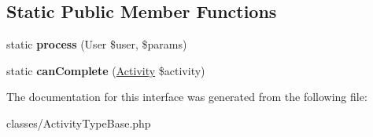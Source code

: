 \subsection*{Static Public Member Functions}
\begin{DoxyCompactItemize}
\item 
\hypertarget{interfaceDMA_1_1Friends_1_1Classes_1_1ActivityTypeBaseInterface_ab5fb9bf86960f863debe09ead7297ae7}{static {\bfseries process} (User \$user, \$params)}\label{interfaceDMA_1_1Friends_1_1Classes_1_1ActivityTypeBaseInterface_ab5fb9bf86960f863debe09ead7297ae7}

\item 
\hypertarget{interfaceDMA_1_1Friends_1_1Classes_1_1ActivityTypeBaseInterface_aa972c7d058773de876105dd390082754}{static {\bfseries can\+Complete} (\hyperlink{classDMA_1_1Friends_1_1Models_1_1Activity}{Activity} \$activity)}\label{interfaceDMA_1_1Friends_1_1Classes_1_1ActivityTypeBaseInterface_aa972c7d058773de876105dd390082754}

\end{DoxyCompactItemize}


The documentation for this interface was generated from the following file\+:\begin{DoxyCompactItemize}
\item 
classes/Activity\+Type\+Base.\+php\end{DoxyCompactItemize}
